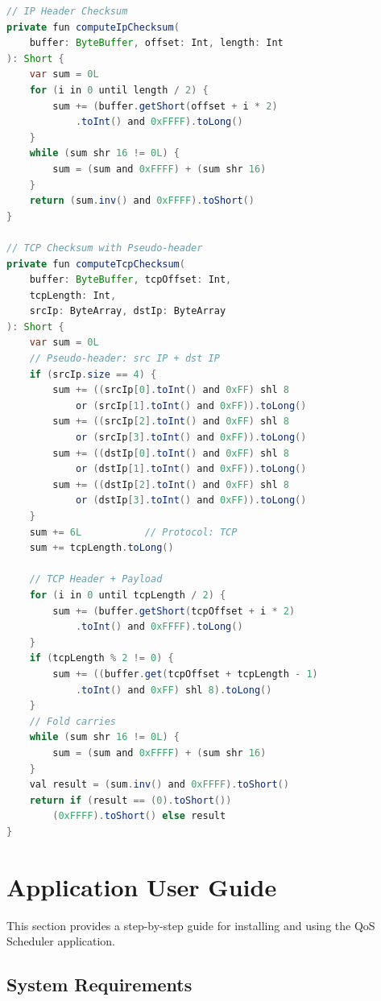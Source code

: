 \begin{lstlisting}[language=Java, caption={Internet Checksum (RFC 1071) implementation}, label={lst:checksum}]
// IP Header Checksum
private fun computeIpChecksum(
    buffer: ByteBuffer, offset: Int, length: Int
): Short {
    var sum = 0L
    for (i in 0 until length / 2) {
        sum += (buffer.getShort(offset + i * 2)
            .toInt() and 0xFFFF).toLong()
    }
    while (sum shr 16 != 0L) {
        sum = (sum and 0xFFFF) + (sum shr 16)
    }
    return (sum.inv() and 0xFFFF).toShort()
}

// TCP Checksum with Pseudo-header
private fun computeTcpChecksum(
    buffer: ByteBuffer, tcpOffset: Int,
    tcpLength: Int,
    srcIp: ByteArray, dstIp: ByteArray
): Short {
    var sum = 0L
    // Pseudo-header: src IP + dst IP
    if (srcIp.size == 4) {
        sum += ((srcIp[0].toInt() and 0xFF) shl 8
            or (srcIp[1].toInt() and 0xFF)).toLong()
        sum += ((srcIp[2].toInt() and 0xFF) shl 8
            or (srcIp[3].toInt() and 0xFF)).toLong()
        sum += ((dstIp[0].toInt() and 0xFF) shl 8
            or (dstIp[1].toInt() and 0xFF)).toLong()
        sum += ((dstIp[2].toInt() and 0xFF) shl 8
            or (dstIp[3].toInt() and 0xFF)).toLong()
    }
    sum += 6L           // Protocol: TCP
    sum += tcpLength.toLong()

    // TCP Header + Payload
    for (i in 0 until tcpLength / 2) {
        sum += (buffer.getShort(tcpOffset + i * 2)
            .toInt() and 0xFFFF).toLong()
    }
    if (tcpLength % 2 != 0) {
        sum += ((buffer.get(tcpOffset + tcpLength - 1)
            .toInt() and 0xFF) shl 8).toLong()
    }
    // Fold carries
    while (sum shr 16 != 0L) {
        sum = (sum and 0xFFFF) + (sum shr 16)
    }
    val result = (sum.inv() and 0xFFFF).toShort()
    return if (result == (0).toShort())
        (0xFFFF).toShort() else result
}
\end{lstlisting}


\section{Application User Guide}
\label{app:user_guide}

This section provides a step-by-step guide for installing and using the QoS Scheduler application.

\subsection{System Requirements}

